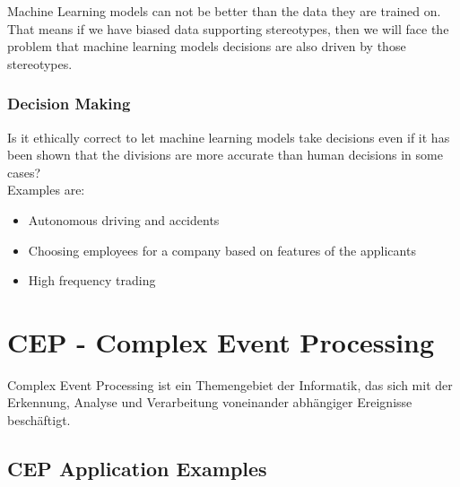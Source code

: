 Machine Learning models can not be better than the data they are trained on. That means if we have biased data supporting stereotypes, then we will face the problem that machine learning models decisions are also driven by those stereotypes.

\subsubsection*{Decision Making}

Is it ethically correct to let machine learning models take decisions even if it has been shown that the divisions are more accurate than human decisions in some cases?\\
Examples are:

\begin{itemize}
    \item Autonomous driving and accidents
    \item Choosing employees for a company based on features of the applicants
    \item High frequency trading
\end{itemize}


\section{CEP - Complex Event Processing}

Complex Event Processing ist ein Themengebiet der Informatik, das sich mit der Erkennung, Analyse und Verarbeitung voneinander abhängiger Ereignisse beschäftigt.

\subsection{CEP Application Examples}

